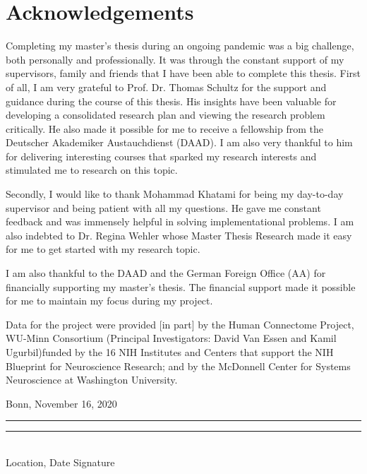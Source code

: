 
\chapter{Acknowledgements}
\thispagestyle{empty}
\noindent%
Completing my master's thesis during an ongoing pandemic was a big challenge, both personally and professionally. It was through the constant support of my supervisors, family and friends that I have been able to complete this thesis. 
First of all, I am very grateful to Prof. Dr. Thomas Schultz for the support and guidance during the course of this thesis. His insights have been valuable for developing a consolidated research plan and viewing the research problem critically. He also made it possible for me to receive a fellowship from the Deutscher Akademiker Austauchdienst (DAAD). I am also very thankful to him for delivering interesting courses that sparked my research interests and stimulated me to research on this topic.

Secondly, I would like to thank Mohammad Khatami for being my day-to-day supervisor and being patient with all my questions. He gave me constant feedback and was immensely helpful in solving implementational problems. I am also indebted to Dr. Regina Wehler whose Master Thesis Research made it easy for me to get started with my research topic. 

I am also thankful to the DAAD and the German Foreign Office (AA) for financially supporting my master's thesis. The financial support made it possible for me to maintain my focus during my project.

Data for the project were provided [in part] by the Human Connectome Project, WU-Minn Consortium (Principal Investigators: David Van Essen and Kamil Ugurbil)funded by the 16 NIH Institutes and Centers that support the NIH Blueprint for Neuroscience Research; and by the McDonnell Center for Systems Neuroscience at Washington University. 
\vfill

Bonn, November 16, 2020 \\
\rule[1em]{14em}{0.5pt}  \hfill \rule[1em]{8em}{0.5pt}\\ %
Location, Date \hfill Signature\\
